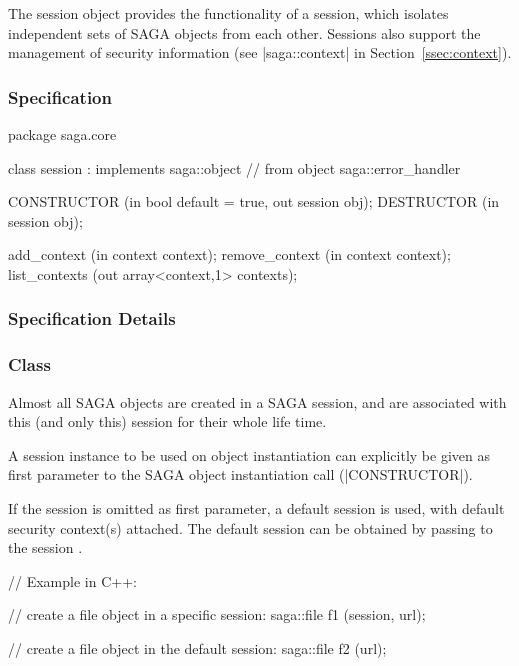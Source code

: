 
  The session object provides the functionality of a session,
   which isolates independent sets of SAGA objects
  from each other.  Sessions also support the management of
  security information (see |saga::context| in
  Section~\ref{ssec:context}).
 
 
 \subsubsection{Specification}
 
 
 \begin{myspec}
  package saga.core
  {
    class session : implements   saga::object
                 // from object  saga::error_handler
    {
      CONSTRUCTOR        (in  bool             default = true,
                          out session          obj);
      DESTRUCTOR         (in  session          obj);
 
      add_context        (in  context          context);
      remove_context     (in  context          context);
      list_contexts      (out array<context,1> contexts);
    }
  }
 \end{myspec}
 
 
 \subsubsection{Specification Details}
 
 \subsubsection*{Class }
 
    Almost all SAGA objects are created in a SAGA session, and
    are associated with this (and only this) session for their
    whole life time.
 
    A session instance to be used on object
    instantiation can explicitly be given as
    first parameter to the SAGA object instantiation call
    (|CONSTRUCTOR|).
 
    If the session is omitted as first parameter, a
    default session is used, with default security
    context(s) attached.
    The default session can be obtained by passing
     to the session .
 
 \newpage

 \begin{mycode}
      // Example in C++:
 
      // create a file object in a specific session:
      saga::file f1 (session, url);
 
      // create a file object in the default session:
      saga::file f2 (url);
 \end{mycode}
 
